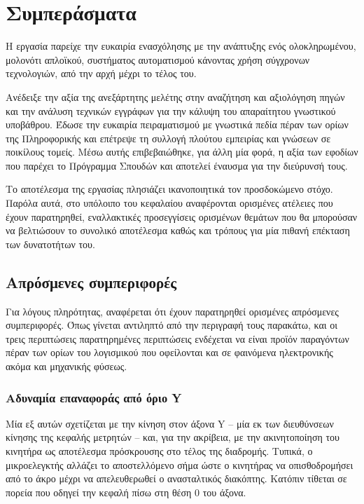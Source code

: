 \chapter{Συμπεράσματα}

Η εργασία παρείχε την ευκαιρία ενασχόλησης με την ανάπτυξης ενός ολοκληρωμένου,
μολονότι απλοϊκού, συστήματος αυτοματισμού κάνοντας χρήση σύγχρονων τεχνολογιών,
από την αρχή μέχρι το τέλος του.

Ανέδειξε την αξία της ανεξάρτητης μελέτης στην αναζήτηση και αξιολόγηση πηγών
και την ανάλυση τεχνικών εγγράφων για την κάλυψη του απαραίτητου γνωστικού
υποβάθρου. Έδωσε την ευκαιρία πειραματισμού με γνωστικά πεδία πέραν των ορίων
της Πληροφορικής και επέτρεψε τη συλλογή πλούτου εμπειρίας και γνώσεων σε
ποικίλους τομείς. Μέσω αυτής επιβεβαιώθηκε, για άλλη μία φορά, η αξία των
εφοδίων που παρέχει το Πρόγραμμα Σπουδών και αποτελεί έναυσμα για την διεύρυνσή
τους.

Το αποτέλεσμα της εργασίας πλησιάζει ικανοποιητικά τον προσδοκώμενο στόχο.
Παρόλα αυτά, στο υπόλοιπο του κεφαλαίου αναφέρονται ορισμένες ατέλειες που έχουν
παρατηρηθεί, εναλλακτικές προσεγγίσεις ορισμένων θεμάτων που θα μπορούσαν να
βελτιώσουν το συνολικό αποτέλεσμα καθώς και τρόπους για μία πιθανή επέκταση των
δυνατοτήτων του.


\section{Απρόσμενες συμπεριφορές}

Για λόγους πληρότητας, αναφέρεται ότι έχουν παρατηρηθεί ορισμένες απρόσμενες
συμπεριφορές. Όπως γίνεται αντιληπτό από την περιγραφή τους παρακάτω, και οι
τρεις περιπτώσεις παρατηρημένες περιπτώσεις ενδέχεται να είναι προϊόν παραγόντων
πέραν των ορίων του λογισμικού που οφείλονται και σε φαινόμενα ηλεκτρονικής
ακόμα και μηχανικής φύσεως.


\subsection*{Αδυναμία επαναφοράς από όριο Y\protect{}}

Μία εξ αυτών σχετίζεται με την κίνηση στον άξονα Y -- μία εκ των διευθύνσεων
κίνησης της κεφαλής μετρητών -- και, για την ακρίβεια, με την ακινητοποίηση του
κινητήρα ως αποτέλεσμα πρόσκρουσης στο τέλος της διαδρομής. Τυπικά, ο
μικροελεγκτής αλλάζει το αποστελλόμενο σήμα ώστε ο κινητήρας να οπισθοδρομήσει
από το άκρο μέχρι να απελευθερωθεί ο ανασταλτικός διακόπτης. Κατόπιν τίθεται σε
πορεία που οδηγεί την κεφαλή πίσω στη θέση 0 του άξονα.


